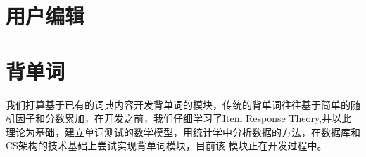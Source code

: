\documentclass[12pt]{article}
\begin{document}
\subsection{\textbf{}}
\section{用户编辑}

\section{背单词}
我们打算基于已有的词典内容开发背单词的模块，传统的背单词往往基于简单的随机因子和分数累加，在开发之前，我们仔细学习了Item Response
Theory,并以此理论为基础，建立单词测试的数学模型，用统计学中分析数据的方法，在数据库和CS架构的技术基础上尝试实现背单词模块，目前该
模块正在开发过程中。
\end{document}
